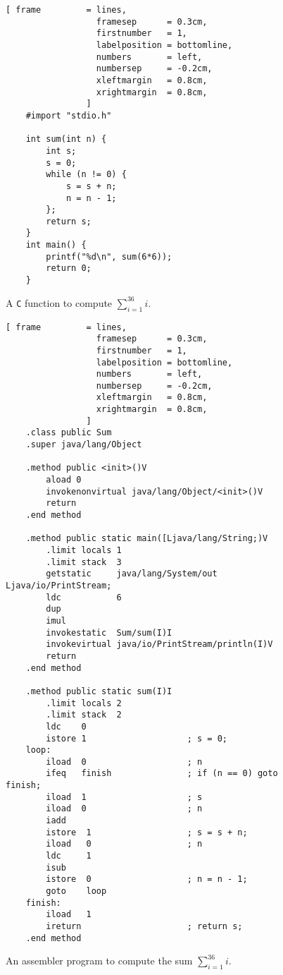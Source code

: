 \begin{figure}[!ht]
\centering
\begin{Verbatim}[ frame         = lines, 
                  framesep      = 0.3cm, 
                  firstnumber   = 1,
                  labelposition = bottomline,
                  numbers       = left,
                  numbersep     = -0.2cm,
                  xleftmargin   = 0.8cm,
                  xrightmargin  = 0.8cm,
                ]
    #import "stdio.h"
    
    int sum(int n) {
        int s;
        s = 0;
        while (n != 0) {
            s = s + n;
            n = n - 1;    
        };
        return s;
    }
    int main() {
        printf("%d\n", sum(6*6));
        return 0;
    }
\end{Verbatim}
\vspace*{-0.3cm}
\caption{A \texttt{C} function to compute  $\sum\limits_{i=1}^{36} i$.}
\label{fig:sum-jasmin.c}
\end{figure}

\begin{figure}[!ht]
\centering
\begin{Verbatim}[ frame         = lines, 
                  framesep      = 0.3cm, 
                  firstnumber   = 1,
                  labelposition = bottomline,
                  numbers       = left,
                  numbersep     = -0.2cm,
                  xleftmargin   = 0.8cm,
                  xrightmargin  = 0.8cm,
                ]
    .class public Sum
    .super java/lang/Object
    
    .method public <init>()V
        aload 0
        invokenonvirtual java/lang/Object/<init>()V
        return
    .end method
    
    .method public static main([Ljava/lang/String;)V
        .limit locals 1
        .limit stack  3
        getstatic     java/lang/System/out Ljava/io/PrintStream;
        ldc           6
        dup
        imul
        invokestatic  Sum/sum(I)I
        invokevirtual java/io/PrintStream/println(I)V
        return
    .end method
    
    .method public static sum(I)I
        .limit locals 2
        .limit stack  2
        ldc    0
        istore 1                    ; s = 0;
    loop:
        iload  0                    ; n
        ifeq   finish               ; if (n == 0) goto finish;
        iload  1                    ; s
        iload  0                    ; n
        iadd
        istore  1                   ; s = s + n;
        iload   0                   ; n
        ldc     1
        isub
        istore  0                   ; n = n - 1;
        goto    loop
    finish:
        iload   1
        ireturn                     ; return s;
    .end method
\end{Verbatim}
\vspace*{-0.3cm}
\caption{An assembler program to compute the sum $\sum\limits_{i=1}^{36} i$.}
\label{fig:Sum.jas}
\end{figure}

